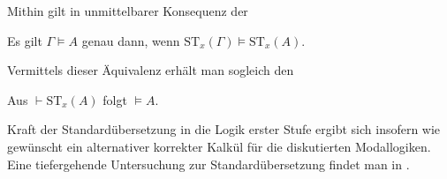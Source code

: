 \noindent
Mithin gilt in unmittelbarer Konsequenz der
\begin{Satz}
Es gilt $\Gamma\models A$ genau dann, wenn
$\mathrm{ST}_x(\Gamma)\models\mathrm{ST}_x(A)$.
\end{Satz}
Vermittels dieser Äquivalenz erhält man sogleich den
\begin{Satz}
Aus $\vdash\mathrm{ST}_x(A)$ folgt $\models A$.
\end{Satz}
Kraft der Standardübersetzung in die Logik erster Stufe ergibt sich
insofern wie gewünscht ein alternativer korrekter Kalkül für die
diskutierten Modallogiken. Eine tiefergehende Untersuchung zur
Standardübersetzung findet man in \cite{Blackburn}.
